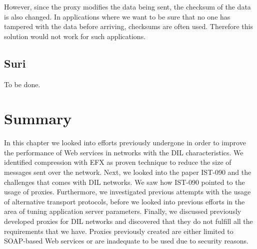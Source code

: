  However, since the proxy modifies the data being sent, the checksum of the data
 is also changed. In applications where we want to be sure that no one has
 tampered with the data before arriving, checksums are often used. Therefore
 this solution would not work for such applications.


\subsection{Suri}
To be done.


\section{Summary}

In this chapter we looked into efforts previously undergone in order to improve
the performance of Web services in networks with the DIL characteristics. We
identified compression with EFX as proven technique to reduce the size of
messages sent over the network. Next, we looked into the paper IST-090 and the
challenges that comes with DIL networks. We saw how IST-090 pointed to the usage
of proxies. Furthermore, we investigated previous attempts with the usage of
alternative transport protocols, before we looked into previous efforts in the
area of tuning application server parameters. Finally, we discussed previously
developed proxies for DIL networks and discovered that they do not fulfill all
the requirements that we have. Proxies previously created are either limited to
SOAP-based Web services or are inadequate to be used due to security reasons.

